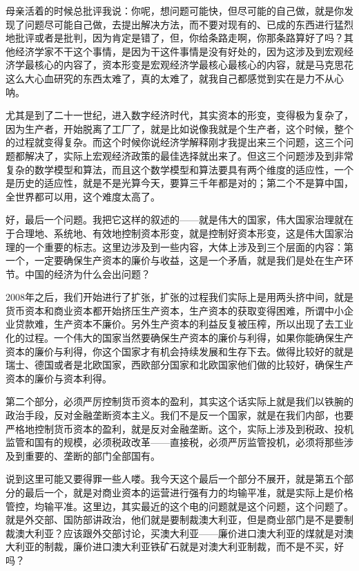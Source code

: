 \documentclass[UTF8, 12pt, a4paper]{ctexrep}
\begin{document}
母亲活着的时候总批评我说：你呢，想问题可能快，但尽可能的自己做，就是你发现了问题尽可能自己做，去提出解决方法，而不要对现有的、已成的东西进行猛烈地批评或者是批判，因为肯定是错了，但，你给条路走啊，你那条路算好了吗？其他经济学家不干这个事情，是因为干这件事情是没有好处的，因为这涉及到宏观经济学最核心的内容了，资本形变是宏观经济学最核心最核心的内容，就是马克思花这么大心血研究的东西太难了，真的太难了，就我自己都感觉到实在是力不从心呐。

尤其是到了二十一世纪，进入数字经济时代，其实资本的形变，变得极为复杂了，因为生产者，开始脱离了工厂了，就是比如说像我就是个生产者，这个时候，整个的过程就变得复杂。而这个时候你说经济学解释刚才我提出来三个问题，这三个问题都解决了，实际上宏观经济政策的最佳选择就出来了。但这三个问题涉及到非常复杂的数学模型和算法，而且这个数学模型和算法要具有两个维度的适应性，一个是历史的适应性，就是不是光算今天，要算三千年都是对的；第二个不是算中国，全世界都可以用，这个难度太高了。

好，最后一个问题。我把它这样的叙述的——就是伟大的国家，伟大国家治理就在于合理地、系统地、有效地控制资本形变，就是控制好资本形变，这是伟大国家治理的一个重要的标志。这里边涉及到一些内容，大体上涉及到三个层面的内容：第一个，一定要确保生产资本的廉价与收益，这是一个矛盾，就是我们是处在生产环节。中国的经济为什么会出问题？

2008年之后，我们开始进行了扩张，扩张的过程我们实际上是用两头挤中间，就是货币资本和商业资本都开始挤压生产资本，生产资本的获取变得困难，所谓中小企业贷款难，生产资本不廉价。另外生产资本的利益反复被压榨，所以出现了去工业化的过程。一个伟大的国家当然要确保生产资本的廉价与利得，如果你能确保生产资本的廉价与利得，你这个国家才有机会持续发展和生存下去。做得比较好的就是瑞士、德国或者是北欧国家，西欧部分国家和北欧国家他们做的比较好，确保生产资本的廉价与资本利得。

第二个部分，必须严厉控制货币资本的盈利，其实这个话实际上就是我们以铁腕的政治手段，反对金融垄断资本主义。我们不是反一个国家，就是在我们内部，也要严格地控制货币资本的盈利，就是反对金融垄断。这个，实际上涉及到税政、投机监管和国有的规模，必须税政改革——直接税，必须严厉监管投机，必须将那些涉及到重要的、垄断的部门全部国有。

说到这里可能又要得罪一些人喽。我今天这个最后一个部分不展开，就是第五个部分的最后一个，就是对商业资本的运营进行强有力的均输平准，就是实际上是价格管控，均输平准。这里边，其实最近的这个电的问题就是这个问题，这个问题了。就是外交部、国防部讲政治，他们就是要制裁澳大利亚，但是商业部门是不是要制裁澳大利亚？应该跟外交部讨论，买澳大利亚——廉价进口澳大利亚的煤就是对澳大利亚的制裁，廉价进口澳大利亚铁矿石就是对澳大利亚制裁，而不是不买，好吗？
\end{document}
